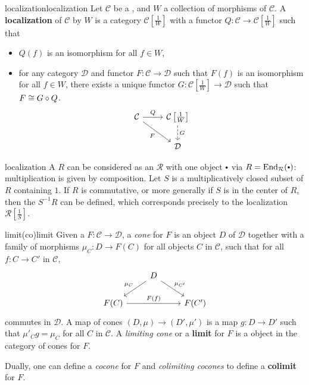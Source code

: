 \begin{topic}{localization}{localization}
    Let $\mathcal{C}$ be a , and $W$ a collection of morphisms of $\mathcal{C}$. A \textbf{localization} of $\mathcal{C}$ by $W$ is a category $\mathcal{C}\left[\frac{1}{W}\right]$ with a functor $Q : \mathcal{C} \to \mathcal{C}\left[\frac{1}{W}\right]$ such that
    \begin{itemize}
        \item $Q(f)$ is an isomorphism for all $f \in W$,
        \item for any category $\mathcal{D}$ and functor $F : \mathcal{C} \to \mathcal{D}$ such that $F(f)$ is an isomorphism for all $f \in W$, there exists a unique functor $G : \mathcal{C}\left[\frac{1}{W}\right] \to \mathcal{D}$ such that $F \cong G \circ Q$.
        \[ \begin{tikzcd} \mathcal{C} \arrow{r}{Q} \arrow[swap]{rd}{F} & \mathcal{C}\left[\frac{1}{W}\right] \arrow[dashed]{d}{G} \\ & \mathcal{D} \end{tikzcd} \]
    \end{itemize}
\end{topic}

\begin{example}{localization}
    A  $R$ can be considered as an  $\mathcal{R}$ with one object $\bdot$ via $R = \textup{End}_\mathcal{R}(\bdot)$: multiplication is given by composition. Let $S$ is a multiplicatively closed subset of $R$ containing $1$. If $R$ is commutative, or more generally if $S$ is in the center of $R$, then the  $S^{-1} R$ can be defined, which corresponds precisely to the localization $\mathcal{R}\left[\frac{1}{S}\right]$.
\end{example}

\begin{topic}{limit}{(co)limit}
    Given a  $F : \mathcal{C} \to \mathcal{D}$, a \textit{cone} for $F$ is an object $D$ of $\mathcal{D}$ together with a family of morphisms $\mu_C : D \to F(C)$ for all objects $C$ in $\mathcal{C}$, such that for all $f : C \to C'$ in $\mathcal{C}$,
    \[ \begin{tikzcd} & D \arrow[swap]{ld}{\mu_C} \arrow{rd}{\mu_{C'}} & \\ F(C) \arrow{rr}{F(f)} && F(C') \end{tikzcd} \]
    commutes in $\mathcal{D}$. A map of cones $(D, \mu) \to (D', \mu')$ is a map $g : D \to D'$ such that $\mu'_C g = \mu_C$ for all $C$ in $\mathcal{C}$. A \textit{limiting cone} or a \textbf{limit} for $F$ is a  object in the category of cones for $F$.
    
    Dually, one can define a \textit{cocone} for $F$ and \textit{colimiting cocones} to define a \textbf{colimit} for $F$.
\end{topic}

